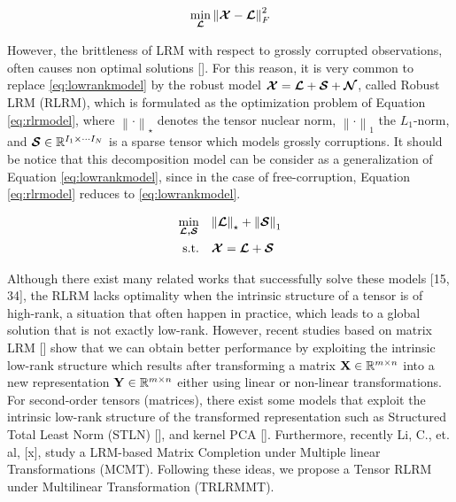 \documentclass[sensors,article,submit,moreauthors,pdftex]{Definitions/mdpi}
\newcommand{\mathmat}[1]{\boldsymbol{\mathbf{\MakeUppercase{#1}}}}
\newcommand{\mathten}[1]{\boldsymbol{\mathbf{\mathcal{\MakeUppercase{#1}}}}}
\begin{document}
\begin{equation}
\min_{\mathten{L}} {\left\lVert \mathten{X}-\mathten{L} \right\rVert}_{F}^2
\label{eq:lowrankmodel}
\end{equation}



However, the brittleness of LRM with respect to grossly corrupted observations, often causes non optimal solutions []. For this reason, it is very common to replace \ref{eq:lowrankmodel} by the robust model $\mathten{X} = \mathten{L} + \mathten{S} + \mathten{N}$, called Robust LRM (RLRM), which is formulated as the optimization problem of Equation \ref{eq:rlrmodel}, where $\left\lVert \cdot \right\rVert_\star$ denotes the tensor nuclear norm, $\left\lVert \cdot \right\rVert_1$ the $L_1$-norm, and $\mathten{S}\in\mathbb{R}^{I_1\times \cdots I_N}$ is a sparse tensor which models grossly corruptions. It should be notice that this decomposition model can be consider as a generalization of Equation \ref{eq:lowrankmodel}, since in the case of free-corruption, Equation \ref{eq:rlrmodel} reduces to \ref{eq:lowrankmodel}.

\begin{equation}
\begin{aligned}
\min_{\mathten{L,S}} \quad & {\left\lVert \mathten{L} \right\rVert_\star + \left\lVert\mathten{S}\right\rVert_1}\\
\textrm{s.t.} \quad & \mathten{X} = \mathten{L} + \mathten{S}
\end{aligned}
\label{eq:rlrmodel}
\end{equation}


Although there exist many related works that successfully solve these models [15, 34], the RLRM lacks optimality when the intrinsic structure of a tensor is of high-rank, a situation that often happen in practice, which leads to a global solution that is not exactly low-rank.  However, recent studies based on matrix LRM [] show that we can obtain better performance by exploiting the intrinsic low-rank structure which results after transforming a matrix $\mathmat{X}\in\mathbb{R}^{m \times n}$ into a new representation $\mathmat{Y}\in\mathbb{R}^{m \times n}$ either using linear or non-linear transformations. For second-order tensors (matrices), there exist some models that exploit the intrinsic low-rank structure of the transformed representation such as Structured Total Least Norm (STLN) [], and kernel PCA []. Furthermore, recently Li, C., et. al, [x], study a LRM-based Matrix Completion under Multiple linear Transformations (MCMT). Following these ideas, we propose a Tensor RLRM under Multilinear Transformation (TRLRMMT).
\end{document}
